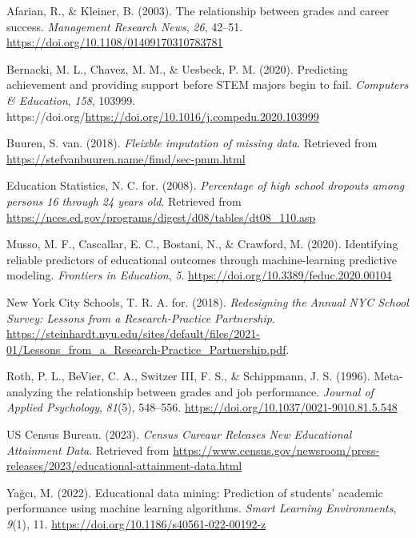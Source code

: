 \documentclass[
  man,floatsintext]{apa6}
\newlength{\cslhangindent}
\newlength{\cslentryspacingunit} %
\newenvironment{CSLReferences}[2] %
 {%
  \setlength{\parindent}{0pt}
  \ifodd #1
  \let\oldpar\par
  \def\par{\hangindent=\cslhangindent\oldpar}
  \fi
  \setlength{\parskip}{#2\cslentryspacingunit}
 }%
 {}
\begin{document}
\hypertarget{refs}{}
\begin{CSLReferences}{1}{0}
\leavevmode{}%
Afarian, R., \& Kleiner, B. (2003). The relationship between grades and career success. \emph{Management Research News}, \emph{26}, 42--51. \url{https://doi.org/10.1108/01409170310783781}

\leavevmode{}%
Bernacki, M. L., Chavez, M. M., \& Uesbeck, P. M. (2020). Predicting achievement and providing support before STEM majors begin to fail. \emph{Computers \& Education}, \emph{158}, 103999. https://doi.org/\url{https://doi.org/10.1016/j.compedu.2020.103999}

\leavevmode{}%
Buuren, S. van. (2018). \emph{Fleixble imputation of missing data}. Retrieved from \url{https://stefvanbuuren.name/fimd/sec-pmm.html}

\leavevmode{}%
Education Statistics, N. C. for. (2008). \emph{Percentage of high school dropouts among persons 16 through 24 years old}. Retrieved from \url{https://nces.ed.gov/programs/digest/d08/tables/dt08_110.asp}

\leavevmode{}%
Musso, M. F., Cascallar, E. C., Bostani, N., \& Crawford, M. (2020). Identifying reliable predictors of educational outcomes through machine-learning predictive modeling. \emph{Frontiers in Education}, \emph{5}. \url{https://doi.org/10.3389/feduc.2020.00104}

\leavevmode{}%
New York City Schools, T. R. A. for. (2018). \emph{{R}edesigning the {A}nnual {N}{Y}{C} {S}chool {S}urvey: {L}essons from a {R}esearch-{P}ractice {P}artnership}. \url{https://steinhardt.nyu.edu/sites/default/files/2021-01/Lessons_from_a_Research-Practice_Partnership.pdf}.

\leavevmode{}%
Roth, P. L., BeVier, C. A., Switzer III, F. S., \& Schippmann, J. S. (1996). Meta-analyzing the relationship between grades and job performance. \emph{Journal of Applied Psychology}, \emph{81}(5), 548--556. \url{https://doi.org/10.1037/0021-9010.81.5.548}

\leavevmode{}%
US Census Bureau. (2023). \emph{Census {Cureaur} {Releases} {New} {Educational} {Attainment} {Data}}. Retrieved from \url{https://www.census.gov/newsroom/press-releases/2023/educational-attainment-data.html}

\leavevmode{}%
Yağcı, M. (2022). Educational data mining: Prediction of students' academic performance using machine learning algorithms. \emph{Smart Learning Environments}, \emph{9}(1), 11. \url{https://doi.org/10.1186/s40561-022-00192-z}

\end{CSLReferences}
\end{document}
